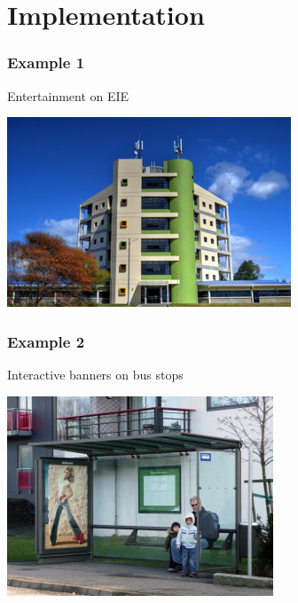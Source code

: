 \documentclass{beamer}
\begin{document}
\section{Implementation}
\begin{frame}
\frametitle{Example 1}
Entertainment on EIE\\
\begin{center}
\includegraphics[scale=0.6]{edificio.jpg}
\end{center}
\end{frame}
\begin{frame}
\frametitle{Example 2}
Interactive banners on bus stops\\
\begin{center}
\includegraphics[scale=1]{bus_stop.jpg}
\end{center}
\end{frame}
\end{document}

